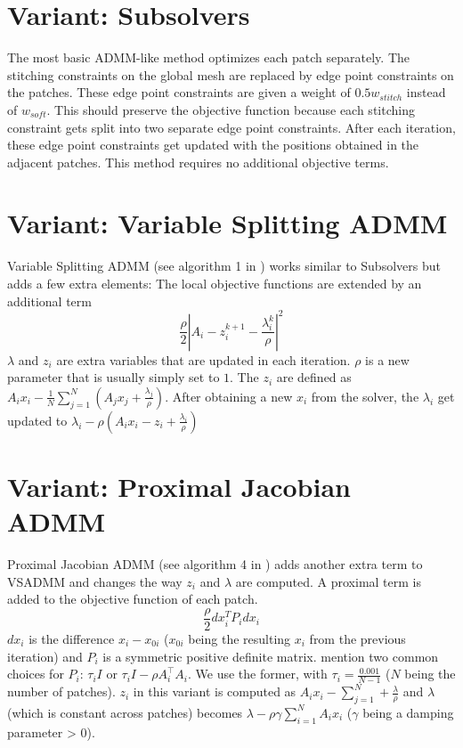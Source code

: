 \documentclass[a4paper,twoside,12pt,nochapterprefix]{scrbook}
\begin{document}
\section{Variant: Subsolvers}
The most basic ADMM-like method optimizes each patch separately. The stitching constraints on the global mesh are replaced by edge point constraints on the patches. These edge point constraints are given a weight of $0.5 w_{stitch}$ instead of $w_{soft}$. This should preserve the objective function because each stitching constraint gets split into two separate edge point constraints.\newline
After each iteration, these edge point constraints get updated with the positions obtained in the adjacent patches. This method requires no additional objective terms.\newline
\section{Variant: Variable Splitting ADMM}
Variable Splitting ADMM (see algorithm 1 in \cite{Deng2017ParallelMA}) works similar to Subsolvers but adds a few extra elements: The local objective functions %
 are extended by an additional term
\begin{equation}
\frac{\rho}{2}|A_i - z^{k+1}_i -\frac{\lambda_i^k}{\rho} |^2 
\end{equation}
$\lambda$ and $z_i$ are extra variables that are updated in each iteration. $\rho$ is a new parameter that is usually simply set to $1$. The $z_i$ are defined as $A_i x_i - \frac{1}{N}\sum_{j=1}^N(A_j x_j + \frac{\lambda_j}{\rho})$. After obtaining a new $x_i$ from the solver, the $\lambda_i$ get updated to $\lambda_i - \rho(A_i x_i - z_i +\frac{\lambda_i}{\rho})$
\section{Variant: Proximal Jacobian ADMM}
Proximal Jacobian ADMM (see algorithm 4 in \cite{Deng2017ParallelMA}) adds another extra term to VSADMM and changes the way $z_i$ and $\lambda$ are computed. A proximal term is added to the objective function of each patch.
\begin{equation}
\frac{\rho}{2} dx_i^T P_i dx_i
\end{equation}
$dx_i$ is the difference $x_i - x_{0i}$ ($x_{0i}$ being the resulting $x_i$ from the previous iteration) and $P_i$ is a symmetric positive definite matrix. \cite{Deng2017ParallelMA} mention two common choices for $P_i$: $\tau_i I$ or $\tau_i I -\rho A_i^\top A_i$. We use the former, with $\tau_i = \frac{0.001}{N-1}$ ($N$ being the number of patches).\newline
$z_i$ in this variant is computed as $A_i x_i - \sum_{j=1}^N + \frac{\lambda}{\rho}$ and $\lambda$ (which is constant across patches) becomes $\lambda - \rho \gamma \sum_{i=1}^N A_i x_i$ ($\gamma$ being a damping parameter > $0$).
\end{document}

